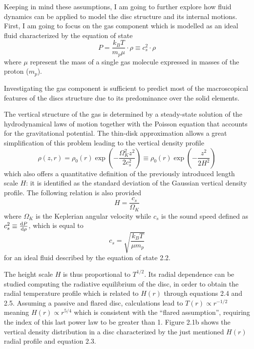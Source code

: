 \documentclass[a4paper,10pt]{report}
\begin{document}
Keeping in mind these assumptions, I am going to further explore how fluid dynamics can be applied to model the disc 
structure and its internal motions. First, I am going to focus on the gas component which is modelled as an ideal fluid characterized
by the equation of state
\begin{equation}
    P = \frac{k_BT}{m_p\mu}\cdot \rho \equiv c_s^2 \cdot \rho
\end{equation}
where $\mu$ represent the mass of a single gas molecule expressed in masses of the proton ($m_p$).

Investigating the gas component is sufficient to predict most of the macroscopical features of the discs structure due to its
predominance over the solid elements. 

The vertical structure of the gas is determined by a steady-state solution of the hydrodynamical laws of motion together with the Poisson equation that
accounts for the gravitational potential. The thin-disk approximation allows a great simplification
 of this problem leading to the vertical density profile
\begin{equation}
    \rho(z, r) = \rho_0(r)\exp(-\frac{\Omega_K^2z^2}{2c_s^2}) \equiv \rho_0(r)\exp(-\frac{z^2}{2H^2})
\end{equation}
which also offers a quantitative definition of the previously introduced length scale
$H$: it is identified as the 
standard deviation of the Gaussian vertical density profile.
The following relation is also provided
\begin{equation}
    H = \frac{c_s}{\Omega_K}
\end{equation}
where $\Omega_K$ is the Keplerian 
angular velocity while $c_s$ is the sound speed defined as $c_s^2 \equiv \dv{P}{\rho}$, which is equal to 
\begin{equation}
    c_s = \sqrt{\frac{k_BT}{\mu m_p}}
\end{equation}
for an 
ideal fluid described by the equation of state 2.2.

The height scale $H$ is thus proportional to $T^{1/2}$. Its radial dependence
can be studied computing the radiative equilibrium of the disc, in order to obtain the 
radial temperature profile which is related to $H(r)$ through equations 2.4 and 2.5.
Assuming a passive and flared disc, calculations lead to $T(r) \propto r^{-1/2}$ 
meaning $H(r) \propto r^{5/4}$ which is consistent with the ``flared assumption'', requiring the index of this last
power law to be greater than 1.
Figure 2.1b shows the vertical density distribution in a disc characterized by the just mentioned $H(r)$ radial profile
and equation 2.3.
\end{document}

